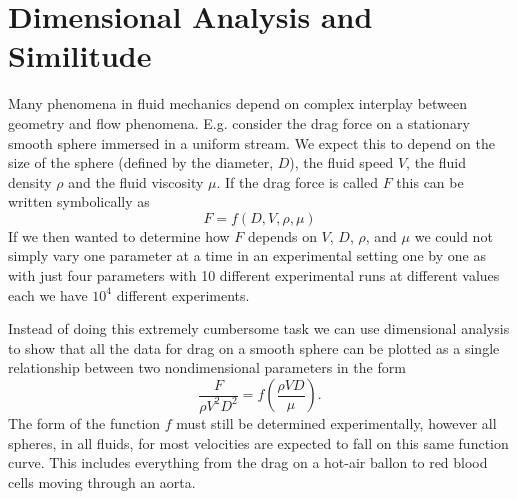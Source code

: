 
\section{Dimensional Analysis and Similitude} \label{sec:diman}
Many phenomena in fluid mechanics depend on complex interplay between geometry and flow phenomena. E.g. consider the drag force on a stationary smooth sphere immersed in a uniform stream. We expect this to depend on the size of the sphere (defined by the diameter, $D$), the fluid speed $V$, the fluid density $\rho$ and the fluid viscosity $\mu$. If the drag force is called $F$ this can be written symbolically as
\begin{equation} \label{eq:dragsym}
  F = f(D, V, \rho, \mu)
\end{equation}
If we then wanted to determine how $F$ depends on $V$, $D$, $\rho$, and $\mu$ we could not simply vary one parameter at a time in an experimental setting one by one as with just four parameters with 10 different experimental runs at different values each we have $10^{4}$ different experiments.

Instead of doing this extremely cumbersome task we can use dimensional analysis to show that all the data for drag on a smooth sphere can be plotted as a single relationship between two nondimensional parameters in the form
\[ 
\frac{F}{\rho V^2 D^2} = f \left( \frac{\rho V D}{\mu} \right)
.\]
The form of the function $f$ must still be determined experimentally, however all spheres, in all fluids, for most velocities are expected to fall on this same function curve. This includes everything from the drag on a hot-air ballon to red blood cells moving through an aorta. 


